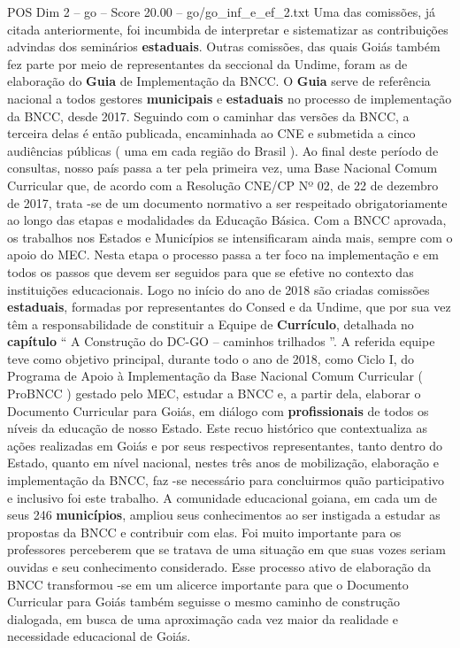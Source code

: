 \begin{textsample}{POS Dim 2 – go – Score 20.00 – go/go\_inf\_e\_ef\_2.txt}
Uma das comissões, já citada anteriormente, foi incumbida de interpretar e sistematizar as contribuições advindas dos seminários \textbf{estaduais}.
Outras comissões, das quais Goiás também fez parte por meio de representantes da seccional da Undime, foram as de elaboração do \textbf{Guia} de Implementação da BNCC.
O \textbf{Guia} serve de referência nacional a todos gestores \textbf{municipais} e \textbf{estaduais} no processo de implementação da BNCC, desde 2017.
Seguindo com o caminhar das versões da BNCC, a terceira delas é então publicada, encaminhada ao CNE e submetida a cinco audiências públicas ( uma em cada região do Brasil ).
Ao final deste período de consultas, nosso país passa a ter pela primeira vez, uma Base Nacional Comum Curricular que, de acordo com a Resolução CNE/CP Nº 02, de 22 de dezembro de 2017, trata -se de um documento normativo a ser respeitado obrigatoriamente ao longo das etapas e modalidades da Educação Básica.
Com a BNCC aprovada, os trabalhos nos Estados e Municípios se intensificaram ainda mais, sempre com o apoio do MEC.
Nesta etapa o processo passa a ter foco na implementação e em todos os passos que devem ser seguidos para que se efetive no contexto das instituições educacionais.
Logo no início do ano de 2018 são criadas comissões \textbf{estaduais}, formadas por representantes do Consed e da Undime, que por sua vez têm a responsabilidade de constituir a Equipe de \textbf{Currículo}, detalhada no \textbf{capítulo} “ A Construção do DC-GO – caminhos trilhados ”.
A referida equipe teve como objetivo principal, durante todo o ano de 2018, como Ciclo I, do Programa de Apoio à Implementação da Base Nacional Comum Curricular ( ProBNCC ) gestado pelo MEC, estudar a BNCC e, a partir dela, elaborar o Documento Curricular para Goiás, em diálogo com \textbf{profissionais} de todos os níveis da educação de nosso Estado.
Este recuo histórico que contextualiza as ações realizadas em Goiás e por seus respectivos representantes, tanto dentro do Estado, quanto em nível nacional, nestes três anos de mobilização, elaboração e implementação da BNCC, faz -se necessário para concluirmos quão participativo e inclusivo foi este trabalho.
A comunidade educacional goiana, em cada um de seus 246 \textbf{municípios}, ampliou seus conhecimentos ao ser instigada a estudar as propostas da BNCC e contribuir com elas.
Foi muito importante para os professores perceberem que se tratava de uma situação em que suas vozes seriam ouvidas e seu conhecimento considerado.
Esse processo ativo de elaboração da BNCC transformou -se em um alicerce importante para que o Documento Curricular para Goiás também seguisse o mesmo caminho de construção dialogada, em busca de uma aproximação cada vez maior da realidade e necessidade educacional de Goiás.

\end{textsample}
